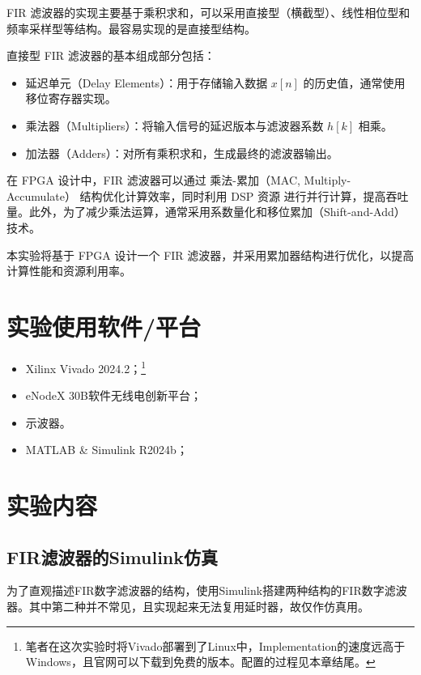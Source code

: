\documentclass[lang=cn,newtx,10pt,scheme=chinese]{elegantbook}
\begin{document}
FIR 滤波器的实现主要基于乘积求和，可以采用直接型（横截型）、线性相位型和频率采样型等结构。最容易实现的是直接型结构。


直接型 FIR 滤波器的基本组成部分包括：
\begin{itemize}
    \item 延迟单元（Delay Elements）：用于存储输入数据 $x[n]$ 的历史值，通常使用移位寄存器实现。
    \item 乘法器（Multipliers）：将输入信号的延迟版本与滤波器系数 $h[k]$ 相乘。
    \item 加法器（Adders）：对所有乘积求和，生成最终的滤波器输出。
\end{itemize}

在 FPGA 设计中，FIR 滤波器可以通过 乘法-累加（MAC, Multiply-Accumulate） 结构优化计算效率，同时利用 DSP 资源 进行并行计算，提高吞吐量。此外，为了减少乘法运算，通常采用系数量化和移位累加（Shift-and-Add）技术。

本实验将基于 FPGA 设计一个 FIR 滤波器，并采用累加器结构进行优化，以提高计算性能和资源利用率。
\section{实验使用软件/平台}
\begin{itemize}
  \item Xilinx Vivado 2024.2；\footnote{笔者在这次实验时将Vivado部署到了Linux中，Implementation的速度远高于Windows，且官网可以下载到免费的版本。配置的过程见本章结尾。}
  \item eNodeX 30B软件无线电创新平台；
  \item 示波器。
  \item MATLAB \& Simulink R2024b；
\end{itemize}
\section{实验内容}
\subsection{FIR滤波器的Simulink仿真}
为了直观描述FIR数字滤波器的结构，使用Simulink搭建两种结构的FIR数字滤波器。其中第二种并不常见，且实现起来无法复用延时器，故仅作仿真用。
\end{document}
